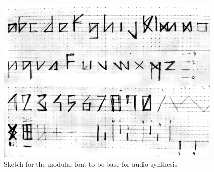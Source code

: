 




\begin{figure}[!ht]
   
       \includegraphics[width=1\linewidth]{pictures/audiotype_sketch}
   \caption{Sketch for the modular font to be base for audio synthesis.}
    \label{fig:sketch}
 \end{figure}


%   

